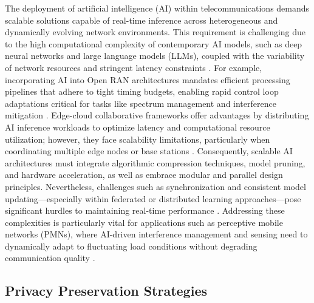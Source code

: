 \documentclass[sigconf]{acmart}
\begin{document}
The deployment of artificial intelligence (AI) within telecommunications demands scalable solutions capable of real-time inference across heterogeneous and dynamically evolving network environments. This requirement is challenging due to the high computational complexity of contemporary AI models, such as deep neural networks and large language models (LLMs), coupled with the variability of network resources and stringent latency constraints \cite{ref7,ref49,ref52,ref53}. For example, incorporating AI into Open RAN architectures mandates efficient processing pipelines that adhere to tight timing budgets, enabling rapid control loop adaptations critical for tasks like spectrum management and interference mitigation \cite{ref48}. Edge-cloud collaborative frameworks offer advantages by distributing AI inference workloads to optimize latency and computational resource utilization; however, they face scalability limitations, particularly when coordinating multiple edge nodes or base stations \cite{ref49}. Consequently, scalable AI architectures must integrate algorithmic compression techniques, model pruning, and hardware acceleration, as well as embrace modular and parallel design principles. Nevertheless, challenges such as synchronization and consistent model updating—especially within federated or distributed learning approaches—pose significant hurdles to maintaining real-time performance \cite{ref52}. Addressing these complexities is particularly vital for applications such as perceptive mobile networks (PMNs), where AI-driven interference management and sensing need to dynamically adapt to fluctuating load conditions without degrading communication quality \cite{ref53}.

\subsection{Privacy Preservation Strategies}
\end{document}
